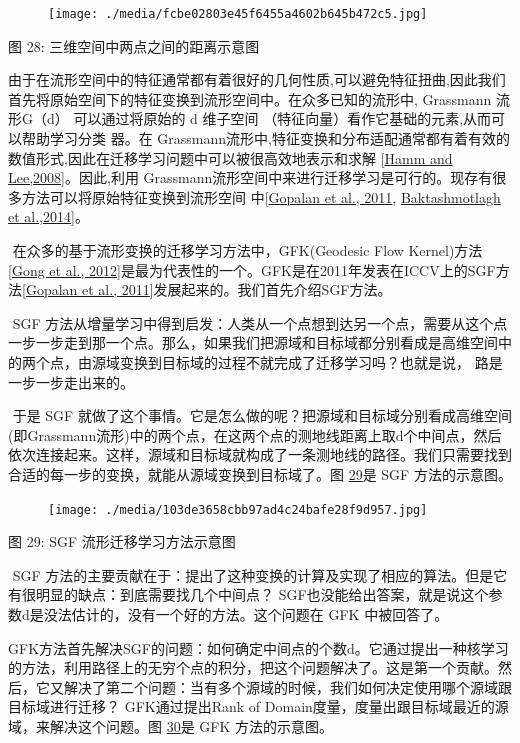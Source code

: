 \begin{figure}
\centering
\texttt{[image: ./media/fcbe02803e45f6455a4602b645b472c5.jpg]}
\caption{}
\end{figure}

图 28: 三维空间中两点之间的距离示意图

​
由于在流形空间中的特征通常都有着很好的几何性质,可以避免特征扭曲,因此我们首先将原始空间下的特征变换到流形空间中。在众多已知的流形中,
Grassmann 流形G（d） 可以通过将原始的 d 维子空间
（特征向量）看作它基础的元素,从而可以帮助学习分类 器。在
Grassmann流形中,特征变换和分布适配通常都有着有效的数值形式,因此在迁移学习问题中可以被很高效地表示和求解
{[}\protect\hyperlink{bookmark260}{Hamm and Lee,2008}{]}。因此,利用
Grassmann流形空间中来进行迁移学习是可行的。现存有很多方法可以将原始特征变换到流形空间
中{[}\protect\hyperlink{bookmark257}{Gopalan et al., 2011},
\protect\hyperlink{bookmark230}{Baktashmotlagh et al.,2014}{]}。

​ 在众多的基于流形变换的迁移学习方法中，GFK(Geodesic Flow
Kernel)方法{[}\protect\hyperlink{bookmark255}{Gong et al.,
2012}{]}是最为代表性的一个。GFK是在2011年发表在ICCV上的SGF方法{[}\protect\hyperlink{bookmark257}{Gopalan
et al., 2011}{]}发展起来的。我们首先介绍SGF方法。

​ SGF
方法从增量学习中得到启发：人类从一个点想到达另一个点，需要从这个点一步一步走到那一个点。那么，如果我们把源域和目标域都分别看成是高维空间中的两个点，由源域变换到目标域的过程不就完成了迁移学习吗？也就是说，
路是一步一步走出来的。

​ 于是 SGF
就做了这个事情。它是怎么做的呢？把源域和目标域分别看成高维空间
(即Grassmann流形)中的两个点，在这两个点的测地线距离上取d个中间点，然后依次连接起来。这样，源域和目标域就构成了一条测地线的路径。我们只需要找到合适的每一步的变换，就能从源域变换到目标域了。图
\protect\hyperlink{bookmark133}{29}是 SGF 方法的示意图。

\begin{figure}
\centering
\texttt{[image: ./media/103de3658cbb97ad4c24bafe28f9d957.jpg]}
\caption{}
\end{figure}

图 29: SGF 流形迁移学习方法示意图

​ SGF
方法的主要贡献在于：提出了这种变换的计算及实现了相应的算法。但是它有很明显的缺点：到底需要找几个中间点？
SGF也没能给出答案，就是说这个参数d是没法估计的，没有一个好的方法。这个问题在
GFK 中被回答了。

​
GFK方法首先解决SGF的问题：如何确定中间点的个数d。它通过提出一种核学习的方法，利用路径上的无穷个点的积分，把这个问题解决了。这是第一个贡献。然后，它又解决了第二个问题：当有多个源域的时候，我们如何决定使用哪个源域跟目标域进行迁移？
GFK通过提出Rank of
Domain度量，度量出跟目标域最近的源域，来解决这个问题。图
\protect\hyperlink{bookmark134}{30}是 GFK 方法的示意图。

